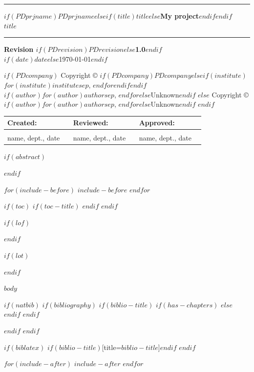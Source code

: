 \documentclass[english$if(classoption)$,$for(classoption)$$classoption$$sep$,$endfor$$endif$]{article}
\newcommand{\QMSdoctype}{$title$}
\newcommand{\QMSprjname}{$if(PDprjname)$$PDprjname$$else$$if(title)$$title$$else$My project$endif$$endif$}
\newcommand{\QMSrevision}{$if(PDrevision)$$PDrevision$$else$1.0$endif$}
\newcommand{\QMSauthor}{$if(author)$$for(author)$$author$$sep$, $endfor$$else$Unknown$endif$}
\newcommand{\QMScompany}{$if(PDcompany)$$PDcompany$$else$$if(institute)$$for(institute)$$institute$$sep$, $endfor$$endif$$endif$}
\newcommand{\QMStitlepage}{%
  \begin{titlepage}%
    \thispagestyle{empty}%
    \setlength{\parindent}{0mm}%
    \setlength{\parskip}{0mm}%
    \vspace*{\stretch{1}}%
    \rule{\linewidth}{1mm}%
    \begin{flushleft}%
      {\Huge\textbf{\QMSprjname}}\\[5mm]%
      \QMSdoctype%
    \end{flushleft}%
    \rule{\linewidth}{1mm}%
    \vspace*{\stretch{1}}%
    \begin{center}%
      {\large\textbf{Revision \QMSrevision}}\\%
      $if(date)$$date$$else$\today$endif$%
    \end{center}%
    \vspace*{\stretch{1}}%
    \begin{center}%
      $if(PDcompany)$%
        {\large{}Copyright \copyright{} \QMScompany}\\%
        \QMSauthor%
      $else$%
        {\large{}Copyright \copyright{} \QMSauthor}%
      $endif$%
    \end{center}%
    \vspace*{\stretch{1}}%
    
    \begin{tabular}{|p{0.3\linewidth}|p{0.3\linewidth}|p{0.3\linewidth}|}%
      \hline%
      \textbf{Created:} & \textbf{Reviewed:} & \textbf{Approved:} \\%
      \hline%
      & & \\[2cm]%
      \footnotesize{name, dept., date} & \footnotesize{name, dept., date} & \footnotesize{name, dept., date} \\%
      \hline%
    \end{tabular}%
    \vspace*{\stretch{1}}%
  \end{titlepage}%
}
\begin{document}
\QMStitlepage

$if(abstract)$
\begin{abstract}
$abstract$
\end{abstract}
\clearpage
$endif$

$for(include-before)$
$include-before$
$endfor$

$if(toc)$
$if(toc-title)$
\renewcommand*\contentsname{$toc-title$}
$endif$
\tableofcontents
\clearpage
$endif$

$if(lof)$
\listoffigures
\clearpage
$endif$

$if(lot)$
\listoftables
\clearpage
$endif$

$body$

$if(natbib)$
$if(bibliography)$
$if(biblio-title)$
$if(has-chapters)$
\renewcommand\bibname{$biblio-title$}
$else$
\renewcommand\refname{$biblio-title$}
$endif$
$endif$

$endif$
$endif$

$if(biblatex)$
\printbibliography$if(biblio-title)$[title=$biblio-title$]$endif$
$endif$

$for(include-after)$
$include-after$
$endfor$
\end{document}
